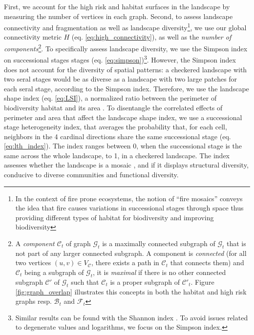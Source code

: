 First, we account for the high risk and habitat surfaces in the landscape by measuring the number of vertices in each graph.
Second, to assess landscape connectivity and fragmentation as well as landscape diversity\footnote{In the context of fire prone ecosystems, the notion of ``fire mosaics'' \citep{bradstock_which_2005} conveys the idea that fire causes variations in successional stages through space thus providing different types of habitat for biodiversity and improving biodiversity}, we use our global connectivity metric $H$ (eq. \ref{eq:high_connectivity}), as well as the \textit{number of components}\footnote{A \textit{component $\mathcal{C}_t$} of graph $\mathcal{G}_t$ is a maximally connected subgraph of $\mathcal{G}_t$ that is not part of any larger connected subgraph. A component is \textit{connected} (for all two vertices $(u,v) \in V_{\mathcal{C}}$, there exists a path in $\mathcal{C}_t$ that connects them) and $\mathcal{C}_t$ being a subgraph of $\mathcal{G}_t$, it is \textit{maximal} if there is no other connected subgraph $\mathcal{C'}$ of $\mathcal{G}_t$ such that $\mathcal{C}_t$ is a proper subgraph of $\mathcal{C'}_t$. Figure \ref{fig:graph_overlap} illustrates this concepts in both the habitat and high risk graphs resp. $\mathcal{B}_t$ and $\mathcal{F}_t$}.
To specifically assess landscape diversity, we use the Simpson index \citep{simpson_measurement_1949} on successional stages stages (eq. \ref{eq:simpson})\footnote{Similar results can be found with the Shannon index \citep{Shannon1949}. To avoid issues related to degenerate values and logarithms, we focus on the Simpson index.}. 
However, the Simpson index does not account for the diversity of spatial patterns: a checkered landscape with two seral stages would be as diverse as a landscape with two large patches for each seral stage, according to the Simpson index. Therefore, we use the landscape shape index (eq. \ref{eq:LSI}), a normalized ratio between the perimeter of biodiversity habitat and its area \citep{patton_diversity_1975, McGarigal_1995}.
To disentangle the correlated effects of perimeter and area that affect the landscape shape index, we use a successional stage heterogeneity index, that averages the probability that, for each cell, neighbors in the 4 cardinal directions share the same successional stage (eq. \ref{eq:lth_index}). The index ranges between 0, when the successional stage is the same across the whole landscape, to 1, in a checkered landscape. The index assesses whether the landscape is a mosaic \citep{bradstock_which_2005}, and if it displays structural diversity, conducive to diverse communities and functional diversity. 

